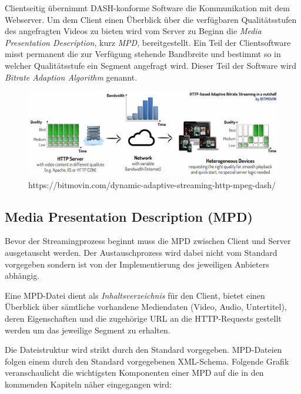 \documentclass[paper = a4, fontsize = 12pt, parskip = half]{scrartcl} %
\begin{document}
Clientseitig übernimmt DASH-konforme Software die Kommunikation mit dem Webserver. Um dem Client einen Überblick über die verfügbaren Qualitätsstufen des angefragten Videos zu bieten wird vom Server zu Beginn die \textit{Media Presentation Description}, kurz \textit{MPD}, bereitgestellt. Ein Teil der Clientsoftware misst permanent die zur Verfügung stehende Bandbreite und bestimmt so in welcher Qualitätsstufe ein Segment angefragt wird. Dieser Teil der Software wird \textit{Bitrate Adaption Algorithm} genannt.

\begin{center}
	\begin{figure}
		\includegraphics[width=14cm]{images/adaptive-streaming-basic.png}
		\caption{https://bitmovin.com/dynamic-adaptive-streaming-http-mpeg-dash/}
	\end{figure}
\end{center}


\subsection{Media Presentation Description (MPD)}
Bevor der Streamingprozess beginnt muss die MPD zwischen Client und Server ausgetauscht werden. Der Austauschprozess wird dabei nicht vom Standard vorgegeben sondern ist von der Implementierung des jeweiligen Anbieters abhängig.

Eine MPD-Datei dient als \textit{Inhaltsverzeichnis} für den Client, bietet einen Überblick über sämtliche vorhandene Mediendaten (Video, Audio, Untertitel), deren Eigenschaften und die zugehörige URL an die HTTP-Requests gestellt werden um das jeweilige Segment zu erhalten.

Die Dateistruktur wird strikt durch den Standard vorgegeben. MPD-Dateien folgen einem durch den Standard vorgegebenen XML-Schema. Folgende Grafik veranschaulicht die wichtigsten Komponenten einer MPD auf die in den kommenden Kapiteln näher eingegangen wird:
\end{document}
